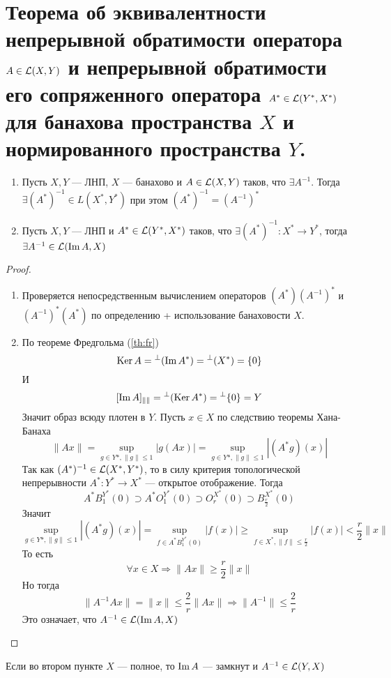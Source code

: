 \newpage
\section{Теорема об эквивалентности непрерывной обратимости оператора $A \in \mathcal{L}(X,Y)$ и непрерывной обратимости его сопряженного оператора $A^* \in \mathcal{L}(Y^*,X^*)$ для банахова пространства $X$ и нормированного пространства $Y$.}

\begin{claim}
	\hfill
	\begin{enumerate}
		\item Пусть $X,Y$ --- ЛНП, $X$ --- банахово и $A \in \mathcal{L}(X,Y)$ таков, что $\exists A^{-1 }$. Тогда $\exists (A^*)^{-1} \in L(X^*, Y^*)$ при этом $(A^*)^{-1} = (A^{-1})^*$
		\item Пусть $X,Y$ --- ЛНП и $A^* \in \mathcal{L}(Y^*, X^*)$ таков, что $\exists (A^*)^{-1}\colon X^* \to Y^*$, тогда $\exists A^{-1} \in \mathcal{L}(\operatorname{Im} A, X)$
	\end{enumerate}	
\end{claim}
\begin{proof}
	\hfil
	\begin{enumerate}
		\item Проверяется непосредственным вычислением операторов $(A^*)(A^{-1})^*$ и $(A^{-1})^*(A^*)$ по определению + использование банаховости $X$. 
		\item По теореме Фредгольма (\ref{th:fr})
		$$
		\operatorname{Ker} A = {}^\perp(\operatorname{Im} A^*) = {}^\perp (X^*) = \{0\}
		$$
		И
		$$
		[\operatorname{Im} A]_{\|\|} = {}^\perp(\operatorname{Ker} A^*) = {}^\perp\{0\}= Y
		$$
		Значит образ всюду плотен в $Y$. Пусть $x \in X$ по следствию теоремы Хана-Банаха
		$$
		\|Ax\| = \sup\limits_{g \in Y*, \|g\| \leq 1}|g(Ax)| = \sup\limits_{g \in Y*, \|g\| \leq 1} |(A^*g)(x)|
		$$
		Так как $(A^*)^{-1} \in \mathcal{L}(X^*, Y^*)$, то в силу критерия топологической непрерывности $A^* \colon Y^* \to X^*$ --- открытое отображение. Тогда 
		$$
		A^*B_1^{Y^*}(0) \supset A^*O_1^{Y^*}(0) \supset O_r^{X^*}(0) \supset  B_\frac{r}{2}^{X^*}(0)
		$$
		Значит
		$$
		\sup\limits_{g \in Y*, \|g\| \leq 1} |(A^*g)(x)| = \sup\limits_{f \in A^*B_1^{Y^*}(0)} |f(x)| \geq \sup\limits_{f \in X^*, \|f\| \leq \frac{r}{2}} |f(x)| < \frac{r}{2}\|x\|
		$$
		То есть
		$$
		\forall x \in X \Rightarrow \|Ax\| \geq \frac{r}{2}\|x\|
		$$
		Но тогда
		$$
		\|A^{-1}Ax\| = \|x\| \leq \frac{2}{r}\|Ax\| \Rightarrow \|A^{-1}\| \leq \frac{2}{r}
		$$
		Это означает, что $A^{-1} \in \mathcal{L}(\operatorname{Im} A, X)$
	\end{enumerate}
\end{proof}
\begin{remark}
	Если во втором пункте $X$ --- полное, то $\operatorname{Im} A$ --- замкнут и $A^{-1} \in \mathcal{L}(Y,X)$
\end{remark}